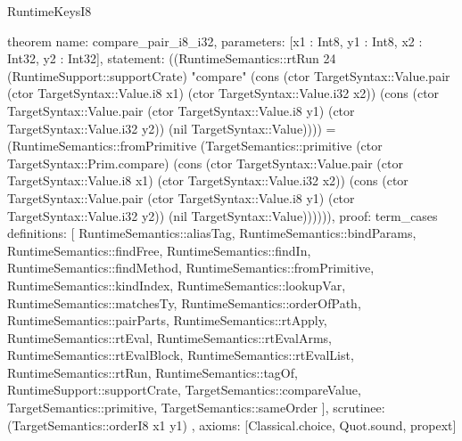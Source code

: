\begin{lexlean}{RuntimeKeysI8}
\begin{semanticmodule}
theorem{
  name: compare_pair_i8_i32,
  parameters: [x1 : Int8, y1 : Int8, x2 : Int32, y2 : Int32],
  statement: ((RuntimeSemantics::rtRun 24 (RuntimeSupport::supportCrate) "compare" (cons (ctor TargetSyntax::Value.pair (ctor TargetSyntax::Value.i8 x1) (ctor TargetSyntax::Value.i32 x2)) (cons (ctor TargetSyntax::Value.pair (ctor TargetSyntax::Value.i8 y1) (ctor TargetSyntax::Value.i32 y2)) (nil TargetSyntax::Value)))) = (RuntimeSemantics::fromPrimitive (TargetSemantics::primitive (ctor TargetSyntax::Prim.compare) (cons (ctor TargetSyntax::Value.pair (ctor TargetSyntax::Value.i8 x1) (ctor TargetSyntax::Value.i32 x2)) (cons (ctor TargetSyntax::Value.pair (ctor TargetSyntax::Value.i8 y1) (ctor TargetSyntax::Value.i32 y2)) (nil TargetSyntax::Value)))))),
  proof: term_cases{
    definitions: [
      RuntimeSemantics::aliasTag,
      RuntimeSemantics::bindParams,
      RuntimeSemantics::findFree,
      RuntimeSemantics::findIn,
      RuntimeSemantics::findMethod,
      RuntimeSemantics::fromPrimitive,
      RuntimeSemantics::kindIndex,
      RuntimeSemantics::lookupVar,
      RuntimeSemantics::matchesTy,
      RuntimeSemantics::orderOfPath,
      RuntimeSemantics::pairParts,
      RuntimeSemantics::rtApply,
      RuntimeSemantics::rtEval,
      RuntimeSemantics::rtEvalArms,
      RuntimeSemantics::rtEvalBlock,
      RuntimeSemantics::rtEvalList,
      RuntimeSemantics::rtRun,
      RuntimeSemantics::tagOf,
      RuntimeSupport::supportCrate,
      TargetSemantics::compareValue,
      TargetSemantics::primitive,
      TargetSemantics::sameOrder
    ],
    scrutinee: (TargetSemantics::orderI8 x1 y1)
  },
  axioms: [Classical.choice, Quot.sound, propext]
}


\end{semanticmodule}
\end{lexlean}
